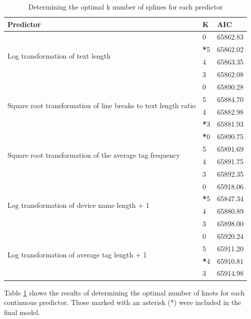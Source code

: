 \documentclass{article}
\begin{document}
\begin{table}[!htbp]
\centering
\begin{tabular}{| p{5cm} | l | l |}
  \hline
  \textbf{Predictor} & \textbf{K} & \textbf{AIC} \\ 
  \hline
  \multirow{ 4 }{ 5cm }{ Log transformation of text length } 
  & 0 & 65862.83 \\ 
  & \textbf{*}5 & 65862.02 \\ 
  & 4 & 65863.35 \\ 
  & 3 & 65862.08 \\ 
  \hline
  \multirow{ 4 }{ 5 cm }{ Square root transformation of line breaks to text length ratio }
  & 0 & 65890.28 \\ 
  & 5 & 65884.70 \\ 
  & 4 & 65882.98 \\ 
  & \textbf{*}3 & 65881.93 \\ 
  \hline
  \multirow{ 4 }{ 5 cm }{ Square root transformation of the average tag frequency }
  & \textbf{*}0 & 65890.75 \\ 
  & 5 & 65891.69 \\ 
  & 4 & 65891.75 \\ 
  & 3 & 65892.35 \\ 
  \hline
  \multirow{ 4 }{ 5 cm }{ Log transformation of device name length + 1 }
  & 0 & 65918.06 \\ 
  & \textbf{*}5 & 65847.34 \\ 
  & 4 & 65880.89 \\ 
  & 3 & 65898.00 \\ 
  \hline
  \multirow{ 4 }{ 5 cm }{ Log transformation of average tag length + 1 }
  & 0 & 65920.24 \\ 
  & 5 & 65911.20 \\ 
  & \textbf{*}4 & 65910.81 \\ 
  & 3 & 65914.98 \\ 
   \hline
\end{tabular}
\caption{Determining the optimal k number of splines for each predictor} 
\label{table:splines}
\end{table}

Table \ref{table:splines} shows the results of determining the optimal number of knots for each continuous predictor. Those marked with an asterisk (*) were included in the final model. 
\end{document}
